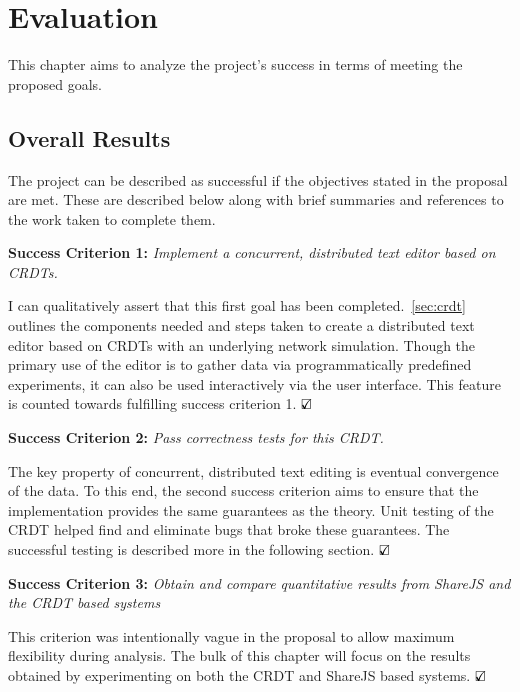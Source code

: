 \documentclass[12pt,a4paper,twoside,openright]{report}
\begin{document}
			
			
			
		


\chapter{Evaluation}
	This chapter aims to analyze the project's success in terms of meeting the proposed goals.

	\section{Overall Results}
	
	The project can be described as successful if the objectives stated in the proposal are met. These are described below along with brief summaries and references to the work taken to complete them.
	
	\textbf{Success Criterion 1:} \textit{Implement a concurrent, distributed text editor based on CRDTs.}
	
	I can qualitatively assert that this first goal has been completed.~\cref{sec:crdt} outlines the components needed and steps taken to create a distributed text editor based on CRDTs with an underlying network simulation. Though the primary use of the editor is to gather data via programmatically predefined experiments, it can also be used interactively via the user interface. This feature is counted towards fulfilling success criterion 1. $\text{\rlap{$\checkmark$}}\square$
	
	\textbf{Success Criterion 2:} \textit{Pass correctness tests for this CRDT.}
	
	The key property of concurrent, distributed text editing is eventual convergence of the data. To this end, the second success criterion aims to ensure that the implementation provides the same guarantees as the theory. Unit testing of the CRDT helped find and eliminate bugs that broke these guarantees. The successful testing is described more in the following section. $\text{\rlap{$\checkmark$}}\square$
	

	\textbf{Success Criterion 3:} \textit{Obtain and compare quantitative results from ShareJS and the CRDT based systems}
	
	This criterion was intentionally vague in the proposal to allow maximum flexibility during analysis. The bulk of this chapter will focus on the results obtained by experimenting on both the CRDT and ShareJS based systems.	$\text{\rlap{$\checkmark$}}\square$
	
\end{document}
